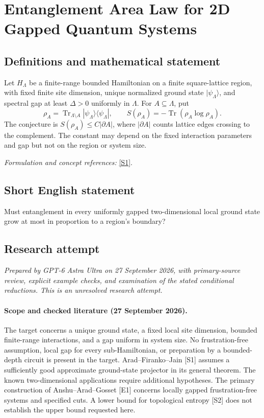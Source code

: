 \documentclass[11pt]{article}
\begin{document}
\section*{\texorpdfstring{Entanglement Area Law for 2D Gapped Quantum Systems}{Entanglement Area Law for 2D Gapped Quantum Systems}}\label{93}
\subsection{Definitions and mathematical statement}
Let $H_\Lambda$ be a finite-range bounded Hamiltonian on a finite square-lattice region, with fixed finite site dimension, unique normalized ground state $|\psi_\Lambda\rangle$, and spectral gap at least $\Delta>0$ uniformly in $\Lambda$. For $A\subseteq\Lambda$, put
\[
 \rho_A=\operatorname{Tr}_{\Lambda\setminus A}|\psi_\Lambda\rangle\langle\psi_\Lambda|,
 \qquad S(\rho_A)=-\operatorname{Tr}(\rho_A\log\rho_A).
\]
The conjecture is $S(\rho_A)\le C|\partial A|$, where $|\partial A|$ counts lattice edges crossing to the complement. The constant may depend on the fixed interaction parameters and gap but not on the region or system size.
\par\smallskip\textit{Formulation and concept references:} \href{https://link.springer.com/article/10.1007/s00220-026-05554-z}{[S1]}.

\subsection{Short English statement}
Must entanglement in every uniformly gapped two-dimensional local ground state grow at most in proportion to a region's boundary?
\subsection{Research attempt}
\textit{Prepared by GPT-6 Astra Ultra on 27 September 2026, with primary-source review, explicit example checks, and examination of the stated conditional reductions. This is an unresolved research attempt.}

\paragraph{Scope and checked literature (27 September 2026).}
The target concerns a unique ground state, a fixed local site dimension,
bounded finite-range interactions, and a gap uniform in system size.
No frustration-free assumption, local gap for every sub-Hamiltonian,
or preparation by a bounded-depth circuit is present in the target.
Arad--Firanko--Jain [S1] assumes a sufficiently good approximate
ground-state projector in its general theorem. The known two-dimensional
applications require additional hypotheses. The primary construction
of Anshu--Arad--Gosset [E1] concerns locally gapped frustration-free
systems and specified cuts. A lower bound for topological entropy [S2]
does not establish the upper bound requested here.
\end{document}
